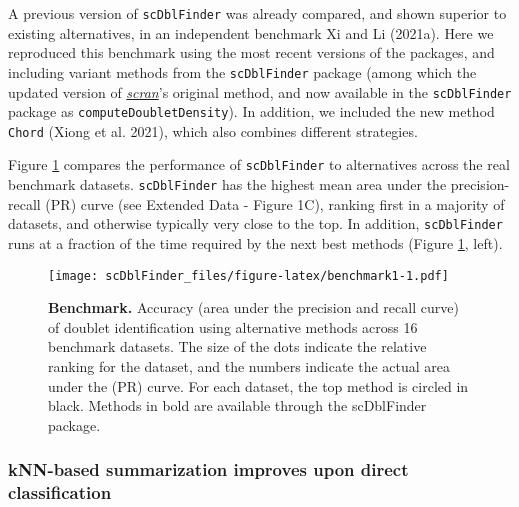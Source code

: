 \documentclass[10pt,a4paper,twocolumn]{article}
\begin{document}
A previous version of \texttt{scDblFinder} was already compared, and shown superior to existing alternatives, in an independent benchmark Xi and Li (2021a).
Here we reproduced this benchmark using the most recent versions of the packages, and including variant methods from the \texttt{scDblFinder} package (among which the updated version of \emph{\href{https://bioconductor.org/packages/3.13/scran}{scran}}'s original method, and now available in the \texttt{scDblFinder} package as \texttt{computeDoubletDensity}). In addition, we included the new method \texttt{Chord} (Xiong et al. 2021), which also combines different strategies.

Figure \ref{fig:benchmark1} compares the performance of \texttt{scDblFinder} to alternatives across the real benchmark datasets.
\texttt{scDblFinder} has the highest mean area under the precision-recall (PR) curve (see Extended Data - Figure 1C), ranking first in a majority of datasets, and otherwise typically very close to the top.
In addition, \texttt{scDblFinder} runs at a fraction of the time required by the next best methods (Figure \ref{fig:benchmark1}, left).

\begin{figure}
\centering
\texttt{[image: scDblFinder\_files/figure-latex/benchmark1-1.pdf]}
\caption{\label{fig:benchmark1}\textbf{Benchmark.} Accuracy (area under the precision and recall curve) of doublet identification using alternative methods across 16 benchmark datasets. The size of the dots indicate the relative ranking for the dataset, and the numbers indicate the actual area under the (PR) curve. For each dataset, the top method is circled in black. Methods in bold are available through the scDblFinder package.}
\end{figure}


\subsubsection{kNN-based summarization improves upon direct classification}
\end{document}
